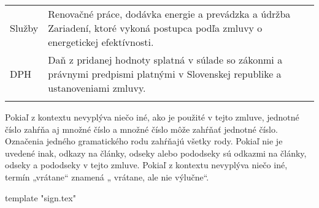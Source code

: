 \documentclass[a4paper]{article}
\begin{document}
\begin{longtabu}{|X|X[2]|}
   \hline

   Služby & Renovačné práce, dodávka energie a prevádzka a údržba Zariadení, ktoré vykoná postupca podľa zmluvy o energetickej efektívnosti.\\\tabucline{}

   \hline

   DPH & Daň z pridanej hodnoty splatná v súlade so zákonmi a právnymi predpismi platnými v Slovenskej republike a ustanoveniami zmluvy.\\\tabucline{}

 \end{longtabu}

 \vspace{5mm}

 Pokiaľ z kontextu nevyplýva niečo iné, ako je použité v tejto zmluve, jednotné číslo zahŕňa aj množné číslo a množné číslo môže zahŕňať jednotné číslo. Označenia jedného gramatického rodu zahŕňajú všetky rody. Pokiaľ nie je uvedené inak, odkazy na články, odseky alebo pododseky sú odkazmi na články, odseky a pododseky v tejto zmluve. Pokiaľ z kontextu nevyplýva niečo iné, termín „vrátane“ znamená „ vrátane, ale nie výlučne“. \par

\vspace{5mm}

{{ template "sign.tex"}}
\end{document}
